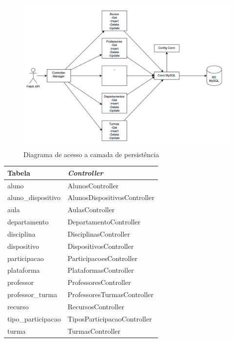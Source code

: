 \documentclass[12pt]{article}
\begin{document}
\begin{figure}[H]
    \centering
    \includegraphics[width=1\textwidth]{diagrama_persistencia.png}
    \caption{Diagrama de acesso a camada de persistência}
\end{figure}

\begin{center}
    \begin{tabular}{|p{}|p{}|}
        \hline
        \textbf{Tabela} & \textbf{\textit{Controller}} \\
        \hline
        aluno & AlunosController \\
        \hline 
        aluno\_dispositivo & AlunosDispositivosController \\
        \hline  
        aula & AulasController \\
        \hline 
        departamento & DepartamentoController \\
        \hline
        disciplina & DisciplinasController \\
        \hline
        dispositivo & DispositivosController \\
        \hline
        participacao & ParticipacoesController \\
        \hline
        plataforma & PlataformasController \\
        \hline
        professor & ProfessoresController \\
        \hline
        professor\_turma & ProfessoresTurmasController \\
        \hline
        recurso & RecursosController \\
        \hline
        tipo\_participacao & TiposParticipacaoController \\
        \hline
        turma & TurmasController \\
        \hline
    \end{tabular}\label{mapeamento-controller}
\end{center}
\end{document}
